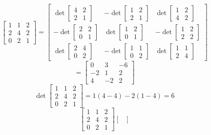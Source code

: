 \documentclass[12pt]{article}
\begin{document}
\begin{itemize}
$$\begin{bmatrix}
1 & 1 & 2 \\
2 & 4 & 2 \\
0 & 2 & 1
\end{bmatrix} = \begin{bmatrix}
\det\begin{bmatrix}
4 & 2 \\
2 & 1
\end{bmatrix} & - \det\begin{bmatrix}
1 & 2 \\
2 & 1
\end{bmatrix} & \det\begin{bmatrix}
1 & 2 \\
4 & 2
\end{bmatrix} \\
-\det\begin{bmatrix}
2 & 2 \\
0 & 1
\end{bmatrix} & \det\begin{bmatrix}
1 & 2 \\
0 & 1
\end{bmatrix} & -\det\begin{bmatrix}
1 & 2 \\
2 & 2
\end{bmatrix} \\
\det\begin{bmatrix}
2 & 4 \\
0 & 2
\end{bmatrix} & -\det\begin{bmatrix}
1 & 1 \\
0 & 2
\end{bmatrix} & \det\begin{bmatrix}
1 & 1 \\
2 & 4
\end{bmatrix}
\end{bmatrix}$$
$$= \begin{bmatrix}
0 & 3 & -6 \\
-2 & 1 & 2 \\
4 & -2 & 2
\end{bmatrix}$$
$$\det\begin{bmatrix}
1 & 1 & 2 \\
2 & 4 & 2 \\
0 & 2 & 1
\end{bmatrix} = 1(4 - 4) - 2(1 - 4) = 6$$
$$\begin{bmatrix}
1 & 1 & 2 \\
2 & 4 & 2 \\
0 & 2 & 1
\end{bmatrix}\begin{bmatrix}

\end{bmatrix}$$
\end{itemize}
\end{document}
